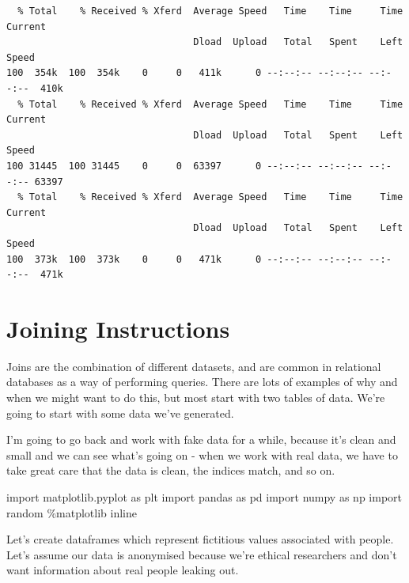 \documentclass[
  letterpaper,
  DIV=11,
  numbers=noendperiod]{scrreprt}
\newenvironment{Shaded}{\begin{snugshade}}{\end{snugshade}}
\newcommand{\ImportTok}[1]{\textcolor[rgb]{0.00,0.46,0.62}{#1}}
\newcommand{\NormalTok}[1]{\textcolor[rgb]{0.00,0.23,0.31}{#1}}
\newcommand{\OperatorTok}[1]{\textcolor[rgb]{0.37,0.37,0.37}{#1}}
\begin{document}
\begin{verbatim}
  % Total    % Received % Xferd  Average Speed   Time    Time     Time  Current
                                 Dload  Upload   Total   Spent    Left  Speed
100  354k  100  354k    0     0   411k      0 --:--:-- --:--:-- --:--:--  410k
  % Total    % Received % Xferd  Average Speed   Time    Time     Time  Current
                                 Dload  Upload   Total   Spent    Left  Speed
100 31445  100 31445    0     0  63397      0 --:--:-- --:--:-- --:--:-- 63397
  % Total    % Received % Xferd  Average Speed   Time    Time     Time  Current
                                 Dload  Upload   Total   Spent    Left  Speed
100  373k  100  373k    0     0   471k      0 --:--:-- --:--:-- --:--:--  471k
\end{verbatim}

\hypertarget{joining-instructions}{%
\section{Joining Instructions}\label{joining-instructions}}

Joins are the combination of different datasets, and are common in
relational databases as a way of performing queries. There are lots of
examples of why and when we might want to do this, but most start with
two tables of data. We're going to start with some data we've generated.

I'm going to go back and work with fake data for a while, because it's
clean and small and we can see what's going on - when we work with real
data, we have to take great care that the data is clean, the indices
match, and so on.

\begin{Shaded}
\begin{Highlighting}[]
\ImportTok{import}\NormalTok{ matplotlib.pyplot }\ImportTok{as}\NormalTok{ plt}
\ImportTok{import}\NormalTok{ pandas }\ImportTok{as}\NormalTok{ pd}
\ImportTok{import}\NormalTok{ numpy }\ImportTok{as}\NormalTok{ np}
\ImportTok{import}\NormalTok{ random}
\OperatorTok{\%}\NormalTok{matplotlib inline}
\end{Highlighting}
\end{Shaded}

Let's create dataframes which represent fictitious values associated
with people. Let's assume our data is anonymised because we're ethical
researchers and don't want information about real people leaking out.
\end{document}
